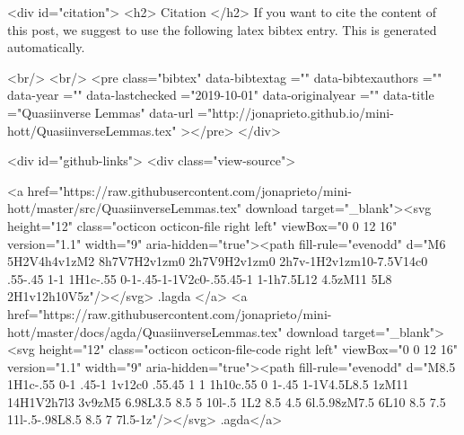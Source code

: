   
  <div id="citation">
  <h2> Citation </h2>
  If you want to cite the content of this post,
  we suggest to use the following latex bibtex entry.
  This is generated automatically.

  <br/>
  <br/>
  <pre class="bibtex"
       data-bibtextag =""
       data-bibtexauthors =""
       data-year =""
       data-lastchecked ="2019-10-01"
       data-originalyear =""
       data-title ="Quasiinverse Lemmas"
       data-url ="http://jonaprieto.github.io/mini-hott/QuasiinverseLemmas.tex"
  ></pre>
  </div>
  

  <div id="github-links">
    <div class="view-source">
      
        <a href="https://raw.githubusercontent.com/jonaprieto/mini-hott/master/src/QuasiinverseLemmas.tex" download target="_blank"><svg height="12" class="octicon octicon-file right left" viewBox="0 0 12 16" version="1.1" width="9" aria-hidden="true"><path fill-rule="evenodd" d="M6 5H2V4h4v1zM2 8h7V7H2v1zm0 2h7V9H2v1zm0 2h7v-1H2v1zm10-7.5V14c0 .55-.45 1-1 1H1c-.55 0-1-.45-1-1V2c0-.55.45-1 1-1h7.5L12 4.5zM11 5L8 2H1v12h10V5z"/></svg> .lagda </a>
        <a href="https://raw.githubusercontent.com/jonaprieto/mini-hott/master/docs/agda/QuasiinverseLemmas.tex" download target="_blank"><svg height="12" class="octicon octicon-file-code right left" viewBox="0 0 12 16" version="1.1" width="9" aria-hidden="true"><path fill-rule="evenodd" d="M8.5 1H1c-.55 0-1 .45-1 1v12c0 .55.45 1 1 1h10c.55 0 1-.45 1-1V4.5L8.5 1zM11 14H1V2h7l3 3v9zM5 6.98L3.5 8.5 5 10l-.5 1L2 8.5 4.5 6l.5.98zM7.5 6L10 8.5 7.5 11l-.5-.98L8.5 8.5 7 7l.5-1z"/></svg> .agda</a>
      

